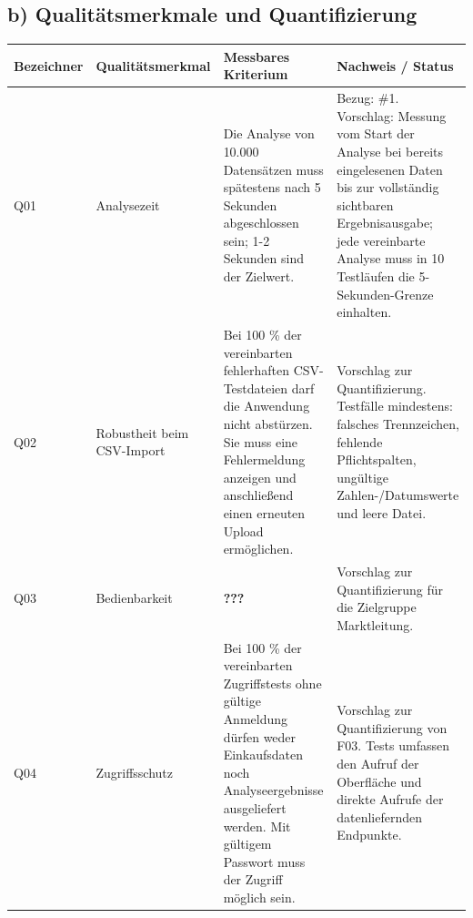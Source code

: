 \documentclass[a4paper,10pt]{article}
\begin{document}
        \subsection*{b) Qualitätsmerkmale und Quantifizierung}
        \begin{longtable}{>{\raggedright\arraybackslash}p{}>{\raggedright\arraybackslash}p{}>{\raggedright\arraybackslash}p{}>{\raggedright\arraybackslash}p{}}
            \toprule
            \textbf{Bezeichner} & \textbf{Qualitätsmerkmal}  & \textbf{Messbares Kriterium}                                                                                                                                                                 & \textbf{Nachweis / Status}                                                                                                                                                                                          \\
            \midrule\endhead
            \bottomrule\endfoot
            Q01                 & Analysezeit                & Die Analyse von 10.000 Datensätzen muss spätestens nach 5 Sekunden abgeschlossen sein; 1-2 Sekunden sind der Zielwert. & Bezug: \#1. Vorschlag: Messung vom Start der Analyse bei bereits eingelesenen Daten bis zur vollständig sichtbaren Ergebnisausgabe; jede vereinbarte Analyse muss in 10 Testläufen die 5-Sekunden-Grenze einhalten. \\
            \midrule
            Q02                 & Robustheit beim CSV-Import & Bei 100 \% der vereinbarten fehlerhaften CSV-Testdateien darf die Anwendung nicht abstürzen. Sie muss eine Fehlermeldung anzeigen und anschlie\ss{}end einen erneuten Upload ermöglichen. & Vorschlag zur Quantifizierung. Testfälle mindestens: falsches Trennzeichen, fehlende Pflichtspalten, ungültige Zahlen-/Datumswerte und leere Datei. \\
            \midrule
            Q03                 & Bedienbarkeit              & \textbf{???}                                                                                                                                                                                 & Vorschlag zur Quantifizierung für die Zielgruppe Marktleitung.                                                                                                                                                      \\
            \midrule
            Q04                 & Zugriffsschutz             & Bei 100 \% der vereinbarten Zugriffstests ohne gültige Anmeldung dürfen weder Einkaufsdaten noch Analyseergebnisse ausgeliefert werden. Mit gültigem Passwort muss der Zugriff möglich sein. & Vorschlag zur Quantifizierung von F03. Tests umfassen den Aufruf der Oberfläche und direkte Aufrufe der datenliefernden Endpunkte. \\
        \end{longtable}
        \clearpage
\end{document}
